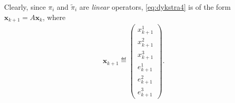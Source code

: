 \documentclass[hidelinks]{article}
\begin{document}
Clearly, since $\pi_i$ and $\tilde{\pi}_i$ are \textit{linear} operators, \eqref{eq:dykstra4} is of the form $\mathbf{x}_{k+1} = A\mathbf{x}_{k}$, where
\begin{align*}
\mathbf{x}_{k+1}\eqdef\begin{pmatrix}x_{k+1}^1\\ x_{k+1}^2 \\ x_{k+1}^3\\ e_{k+1}^1\\ e_{k+1}^2\\ e_{k+1}^3\end{pmatrix}.
\end{align*}


%
%



\end{document}
